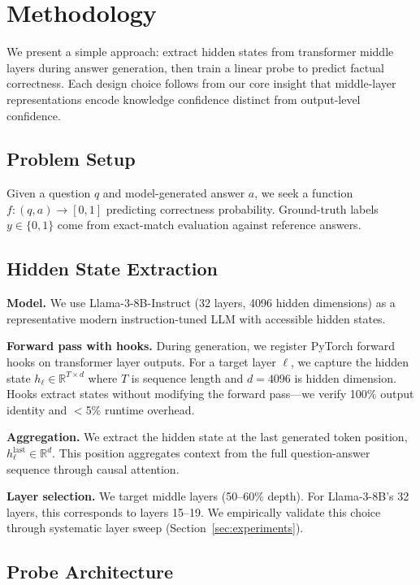 \section{Methodology}

We present a simple approach: extract hidden states from transformer middle layers during answer generation, then train a linear probe to predict factual correctness. Each design choice follows from our core insight that middle-layer representations encode knowledge confidence distinct from output-level confidence.

\subsection{Problem Setup}

Given a question $q$ and model-generated answer $a$, we seek a function $f: (q, a) \rightarrow [0, 1]$ predicting correctness probability. Ground-truth labels $y \in \{0, 1\}$ come from exact-match evaluation against reference answers.

\subsection{Hidden State Extraction}

\textbf{Model.} We use Llama-3-8B-Instruct (32 layers, 4096 hidden dimensions) as a representative modern instruction-tuned LLM with accessible hidden states.

\textbf{Forward pass with hooks.} During generation, we register PyTorch forward hooks on transformer layer outputs. For a target layer $\ell$, we capture the hidden state $h_\ell \in \mathbb{R}^{T \times d}$ where $T$ is sequence length and $d = 4096$ is hidden dimension. Hooks extract states without modifying the forward pass---we verify 100\% output identity and $<$5\% runtime overhead.

\textbf{Aggregation.} We extract the hidden state at the last generated token position, $h_\ell^{\text{last}} \in \mathbb{R}^d$. This position aggregates context from the full question-answer sequence through causal attention.

\textbf{Layer selection.} We target middle layers (50--60\% depth). For Llama-3-8B's 32 layers, this corresponds to layers 15--19. We empirically validate this choice through systematic layer sweep (Section~\ref{sec:experiments}).

\subsection{Probe Architecture}

